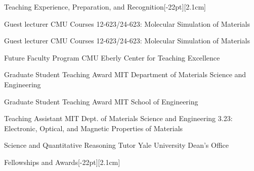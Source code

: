 \documentclass{cv} %
\begin{document}
\begin{cvSection}{Teaching Experience, Preparation, and Recognition}[-22pt][2.1cm]

    {Guest lecturer}
    {CMU Courses 12-623/24-623: Molecular Simulation of Materials}{}

    {}

    {}
           
    {Guest lecturer}
    {CMU Courses 12-623/24-623: Molecular Simulation of Materials}
    {}
    {}

    \cvItem{}
    {Future Faculty Program}
    {CMU Eberly Center for Teaching Excellence}
    {}
  
    {Graduate Student Teaching Award}
    {MIT Department of Materials Science and Engineering}
    {}

    \cvItem{}
    {Graduate Student Teaching Award}
    {MIT School of Engineering}
    {}
  
    {Teaching Assistant}
    {MIT Dept. of Materials Science and Engineering}
    {\vspace{14pt}3.23: Electronic, Optical, and Magnetic Properties of Materials}
    
    {Science and Quantitative Reasoning Tutor}
    {Yale University Dean's Office}
    {}

\end{cvSection}

\begin{cvSection}{Fellowships and Awards}[-22pt][2.1cm]
    
\end{cvSection}

\begin{pubsSection}[-7pt][2.1cm]
  
\end{pubsSection}
\end{document}
